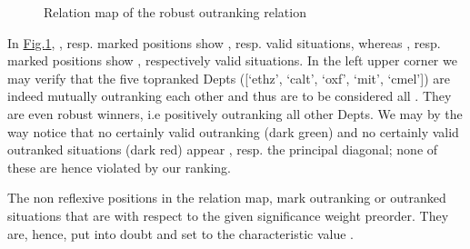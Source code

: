 \documentclass[a4paper,12pt,english]{sphinxhowto}
\let\sphinxpxdimen\pdfpxdimen\else\newdimen\sphinxpxdimen
\begin{document}
\begin{sphinxVerbatim}[commandchars=\\\{\}]
\PYGZbs{}
\end{sphinxVerbatim}

\begin{figure}[H]
\centering
\capstart

\noindent\sphinxincludegraphics[width=600\sphinxpxdimen]{{the_cs_RelationMap}.png}
\caption{Relation map of the robust outranking relation}\label{\detokenize{tutorial:therelationmap}}\end{figure}

In \hyperref[\detokenize{tutorial:therelationmap}]{Fig.\@ \ref{\detokenize{tutorial:therelationmap}}}, , resp.  marked positions show , resp.  valid  situations, whereas , resp.  marked positions show , respectively  valid  situations. In the left upper corner we may verify that the five top\sphinxhyphen{}ranked Depts ({[}‘ethz’, ‘calt’, ‘oxf’, ‘mit’, ‘cmel’{]}) are indeed mutually outranking each other and thus are to be considered all . They are even robust  winners, i.e positively outranking all other Depts. We may by the way notice that no certainly valid outranking (dark green) and no certainly valid outranked situations (dark red) appear , resp.  the principal diagonal; none of these are hence violated by our  ranking.

The non reflexive  positions in the relation map, mark outranking or outranked situations that are  with respect to the given significance weight preorder. They are, hence, put into doubt and set to the  characteristic value .
\end{document}
